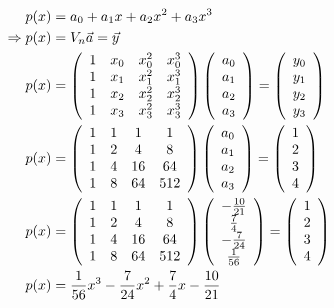 {\begin{enumerate}
\[
\begin{aligned}
  p(x) &= a_0 + a_1 x + a_2 x^2 + a_3 x^3 \\
  \Rightarrow p(x) &= V_n \vect{a} = \vect{y} \\
p(x) &=
\left(\begin{array}{cccc}
  1 & x_0 & x_0^2 & x_0^3 \\
  1 & x_1 & x_1^2 & x_1^3 \\
  1 & x_2 & x_2^2 & x_2^3 \\
  1 & x_3 & x_3^2 & x_3^3
\end{array}\right)
\left(\begin{array}{c}
  a_0 \\
  a_1 \\
  a_2 \\
  a_3
\end{array}\right)
= \left(\begin{array}{c}
  y_0 \\
  y_1 \\
  y_2 \\
  y_3
\end{array}\right) \\
p(x) &= \left(\begin{array}{cccc}
  1 & 1 & 1 & 1 \\
  1 & 2 & 4 & 8 \\
  1 & 4 & 16 & 64 \\
  1 & 8 & 64 & 512
\end{array}\right)
\left(\begin{array}{c}
  a_0 \\
  a_1 \\
  a_2 \\
  a_3
\end{array}\right)
= \left(\begin{array}{c}
  1 \\
  2 \\
  3 \\
  4
\end{array}\right) \\
p(x) &= \left(\begin{array}{cccc}
  1 & 1 & 1 & 1 \\
  1 & 2 & 4 & 8 \\
  1 & 4 & 16 & 64 \\
  1 & 8 & 64 & 512
\end{array}\right)
\left(\begin{array}{c}
  - \frac{10}{21}\\
  \frac{7}{4}\\
  - \frac{7}{24}\\
  \frac{1}{56}
\end{array}\right)
= \left(\begin{array}{c}
  1 \\
  2 \\
  3 \\
  4
\end{array}\right) \\
p(x) &= \frac{1}{56} x^3 - \frac{7}{24} x^2 + \frac{7}{4} x - \frac{10}{21}
\end{aligned}
\]


\end{enumerate}}
